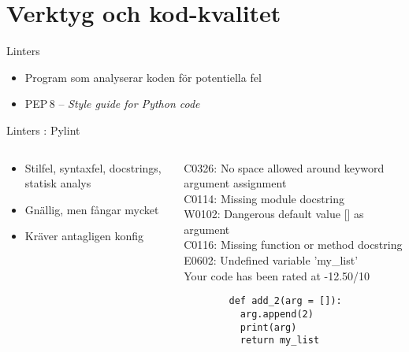 \section{Verktyg och kod-kvalitet}

\begin{frame}{Linters}
    \begin{itemize}
      \item Program som analyserar koden för potentiella fel
      \item PEP\,8 -- \textit{Style guide for Python code}
    \end{itemize}
\end{frame}

\begin{frame}[fragile]{Linters : Pylint}
  \begin{columns}
    \begin{column}{0.6\linewidth}
      \begin{itemize}
        \item Stilfel, syntaxfel, docstrings, statisk analys
        \item Gnällig, men fångar mycket
        \item Kräver antagligen konfig
      \end{itemize}
    \end{column}

    \begin{column}{0.4\linewidth}
      {\ttfamily\tiny
        C0326: No space allowed around keyword argument assignment\\
        C0114: Missing module docstring\\
        W0102: Dangerous default value [] as argument\\
        C0116: Missing function or method docstring\\
        E0602: Undefined variable 'my\_list'\\
        Your code has been rated at -12.50/10
      }

      \begin{verbatim}
        def add_2(arg = []):
          arg.append(2)
          print(arg)
          return my_list
      \end{verbatim}
    \end{column}
  \end{columns}
\end{frame}

